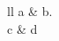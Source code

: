 \documentclass{article}
\begin{document}
\begin{tblr}{ll}
a & b\therownum.\thecolnum \\
c & d\therownum \\
\end{tblr}
\end{document}

